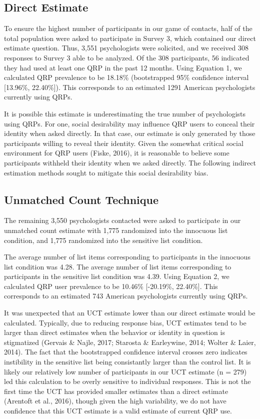 \documentclass[,jou]{apa6}
\theoremstyle{definition}
\theoremstyle{definition}
\theoremstyle{definition}
\theoremstyle{remark}
\begin{document}
\subsection{Direct Estimate}\label{direct-estimate-1}

To ensure the highest number of participants in our game of contacts,
half of the total population were asked to participate in Survey 3,
which contained our direct estimate question. Thus, 3,551 psychologists
were solicited, and we received 308 responses to Survey 3 able to be
analyzed. Of the 308 participants, 56 indicated they had used at least
one QRP in the past 12 months. Using Equation 1, we calculated QRP
prevalence to be 18.18\% (bootstrapped 95\% confidence interval
{[}13.96\%, 22.40\%{]}). This corresponds to an estimated 1291 American
psychologists currently using QRPs.

It is possible this estimate is underestimating the true number of
psychologists using QRPs. For one, social desirability may influence QRP
users to conceal their identity when asked directly. In that case, our
estimate is only generated by those participants willing to reveal their
identity. Given the somewhat critical social environment for QRP users
(Fiske, 2016), it is reasonable to believe some participants withheld
their identity when we asked directly. The following indirect estimation
methods sought to mitigate this social desirability bias.

\subsection{Unmatched Count
Technique}\label{unmatched-count-technique-1}

The remaining 3,550 psychologists contacted were asked to participate in
our unmatched count estimate with 1,775 randomized into the innocuous
list condition, and 1,775 randomized into the sensitive list condition.

The average number of list items corresponding to participants in the
innocuous list condition was 4.28. The average number of list items
corresponding to participants in the sensitive list condition was 4.39.
Using Equation 2, we calculated QRP user prevalence to be 10.46\%
{[}-20.19\%, 22.40\%{]}. This corresponds to an estimated 743 American
psychologists currently using QRPs.

It was unexpected that an UCT estimate lower than our direct estimate
would be calculated. Typically, due to reducing response bias, UCT
estimates tend to be larger than direct estimates when the behavior or
identity in question is stigmatized (Gervais \& Najle, 2017; Starosta \&
Earleywine, 2014; Wolter \& Laier, 2014). The fact that the bootstrapped
confidence interval crosses zero indicates instibility in the sensitive
list being consistantly larger than the control list. It is likely our
relatively low number of participants in our UCT estimate (n = 279) led
this calculation to be overly sensitive to individual responses. This is
not the first time the UCT has provided smaller estimates than a direct
estimate (Arentoft et al., 2016), though given the high variability, we
do not have confidence that this UCT estimate is a valid estimate of
current QRP use.
\end{document}
